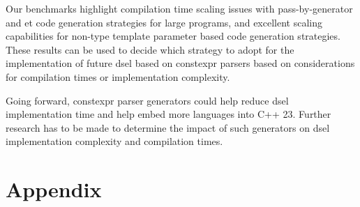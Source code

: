 \documentclass[english,12pt,a4paper]{book}
\providecommand{\cpp}{\textsc{C++}\xspace}
\begin{document}
Our benchmarks highlight compilation time scaling issues with pass-by-generator
and \gls{et} code generation strategies for large programs, and
excellent scaling capabilities for non-type template parameter based code
generation strategies. These results can be used to decide which strategy to
adopt for the implementation of future \gls{dsel} based on \gls{constexpr} parsers
based on considerations for compilation times or implementation complexity.

Going forward, \gls{constexpr} parser generators could help reduce
\gls{dsel} implementation time and help embed more languages into \cpp23.
Further research has to be made to determine the impact of such generators on
\gls{dsel} implementation complexity and compilation times.



\clearpage

\printglossaries

\clearpage
\printbibliography

\chapter{Appendix}

\appendix


\end{document}
